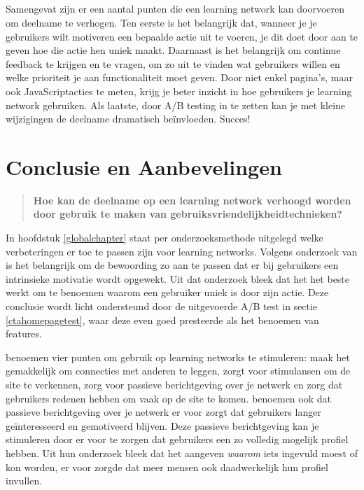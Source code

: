 \documentclass[a4paper, 10pt, pdftex]{report}
\begin{document}
    \paragraph{}
    Samengevat zijn er een aantal punten die een learning network kan doorvoeren om deelname te verhogen. Ten eerste is het belangrijk dat, wanneer je je gebruikers wilt motiveren een bepaalde actie uit te voeren, je dit doet door aan te geven hoe die actie hen uniek maakt.
Daarnaast is het belangrijk om continue feedback te krijgen en te vragen, om zo uit te vinden wat gebruikers willen en welke prioriteit je aan functionaliteit moet geven. Door niet enkel pagina's, maar ook JavaScriptacties te meten, krijg je beter inzicht in hoe gebruikers je learning network gebruiken. Als laatste, door A/B testing in te zetten kan je met kleine wijzigingen de deelname dramatisch be\"invloeden. Succes!

  \newpage
  \chapter*{Conclusie en Aanbevelingen}

    \begin{quotation}
      \textbf{Hoe kan de deelname op een learning network verhoogd worden door gebruik te maken van gebruiksvriendelijkheidtechnieken?}
    \end{quotation}

    In hoofdstuk \ref{globalchapter} staat per onderzoeksmethode uitgelegd welke verbeteringen er toe te passen zijn voor learning networks. Volgens onderzoek van \citeauthor{Beenen2004} is het belangrijk om de bewoording zo aan te passen dat er bij gebruikers een intrinsieke motivatie wordt opgewekt. Uit dat onderzoek bleek dat het het beste werkt om te benoemen waarom een gebruiker uniek is door zijn actie. Deze conclusie wordt licht ondersteund door de uitgevoerde A/B test in sectie \ref{ctahomepagetest}, waar deze even goed presteerde als het benoemen van features.

    \citeauthor{Sohn2005} benoemen vier punten om gebruik op learning networks te stimuleren: maak het gemakkelijk om connecties met anderen te leggen, zorgt voor stimulansen om de site te verkennen, zorg voor passieve berichtgeving over je netwerk en zorg dat gebruikers redenen hebben om vaak op de site te komen. \citeauthor{Brouns2008} benoemen ook dat passieve berichtgeving over je netwerk er voor zorgt dat gebruikers langer ge\"interesseerd en gemotiveerd blijven. Deze passieve berichtgeving kan je stimuleren door er voor te zorgen dat gebruikers een zo volledig mogelijk profiel hebben. Uit hun onderzoek bleek dat het aangeven \emph{waarom} iets ingevuld moest of kon worden, er voor zorgde dat meer mensen ook daadwerkelijk hun profiel invullen.
\end{document}
